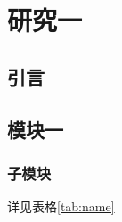 
\chapter{研究一}\label{ch-name}
\section{引言}

\section{模块一}\label{sec-feature}

\subsection{子模块}

详见表格\ref{tab:name}


